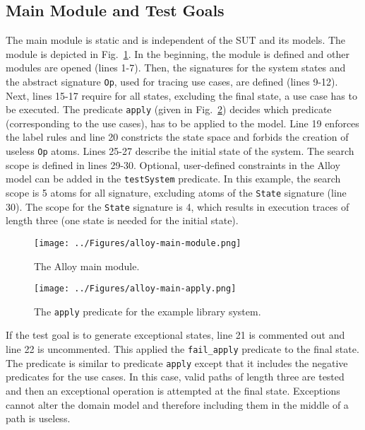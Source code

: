 \subsection{Main Module and Test Goals}
\label{sec:alloy-main-module}
The main module is static and is independent of the SUT and its models. The module is depicted in Fig.~\ref{fig:alloy-main-module}. In the beginning, the module is defined and other modules are opened (lines 1-7). Then, the signatures for the system states and the abstract signature \texttt{Op}, used for tracing use cases, are defined (lines 9-12). Next, lines 15-17 require for all states, excluding the final state, a use case has to be executed. The predicate \texttt{apply} (given in Fig.~\ref{fig:alloy-main-apply}) decides which predicate (corresponding to the use cases), has to be applied to the model. Line 19 enforces the label rules and line 20 constricts the state space and forbids the creation of useless \texttt{Op} atoms. Lines 25-27 describe the initial state of the system. The search scope is defined in lines 29-30. Optional, user-defined constraints in the Alloy model can be added in the \texttt{testSystem} predicate. In this example, the search scope is 5 atoms for all signature, excluding atoms of the \texttt{State} signature (line 30). The scope for the \texttt{State} signature is 4, which results in execution traces of length three (one state is needed for the initial state).

\begin{figure}[h]
\centering
\texttt{[image: ../Figures/alloy-main-module.png]}
\caption{The Alloy main module.}
\label{fig:alloy-main-module}
\end{figure}

\begin{figure}[h]
\centering
\texttt{[image: ../Figures/alloy-main-apply.png]}
\caption{The \texttt{apply} predicate for the example library system.}
\label{fig:alloy-main-apply}
\end{figure}

If the test goal is to generate exceptional states, line 21 is commented out and line 22 is uncommented. This applied the \texttt{fail\_apply} predicate to the final state. The predicate is similar to predicate \texttt{apply} except that it includes the negative predicates for the use cases. In this case, valid paths of length three are tested and then an exceptional operation is attempted at the final state. Exceptions cannot alter the domain model and therefore including them in the middle of a path is useless.


